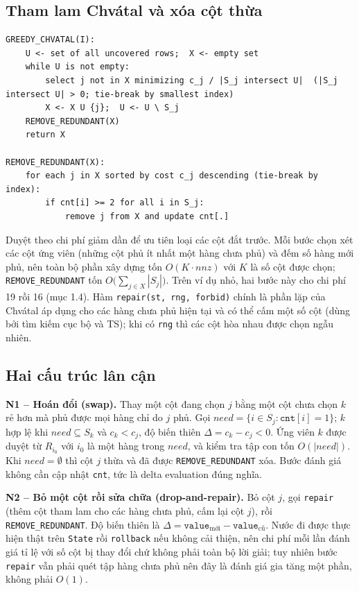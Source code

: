 \documentclass[a4paper,12pt]{article}
\begin{document}
\subsection{Tham lam Chvátal và xóa cột thừa}
\begin{Verbatim}
GREEDY_CHVATAL(I):
    U <- set of all uncovered rows;  X <- empty set
    while U is not empty:
        select j not in X minimizing c_j / |S_j intersect U|  (|S_j intersect U| > 0; tie-break by smallest index)
        X <- X U {j};  U <- U \ S_j
    REMOVE_REDUNDANT(X)
    return X

REMOVE_REDUNDANT(X):
    for each j in X sorted by cost c_j descending (tie-break by index):
        if cnt[i] >= 2 for all i in S_j:
            remove j from X and update cnt[.]
\end{Verbatim}
Duyệt theo chi phí giảm dần để ưu tiên loại các cột đắt trước. Mỗi bước chọn xét các cột ứng viên (những cột phủ ít nhất một hàng chưa phủ) và đếm số hàng mới phủ, nên toàn bộ phần xây dựng tốn $O(K\cdot nnz)$ với $K$ là số cột được chọn; \texttt{REMOVE\_REDUNDANT} tốn $O\bigl(\sum_{j\in X}|S_j|\bigr)$. Trên ví dụ nhỏ, hai bước này cho chi phí 19 rồi 16 (mục 1.4). Hàm \texttt{repair(st, rng, forbid)} chính là phần lặp của Chvátal áp dụng cho các hàng chưa phủ hiện tại và có thể cấm một số cột (dùng bởi tìm kiếm cục bộ và TS); khi có \texttt{rng} thì các cột hòa nhau được chọn ngẫu nhiên.

\subsection{Hai cấu trúc lân cận}
\textbf{N1 -- Hoán đổi (swap).} Thay một cột đang chọn $j$ bằng một cột chưa chọn $k$ rẻ hơn mà phủ được mọi hàng chỉ do $j$ phủ. Gọi $need=\{i\in S_j:\texttt{cnt}[i]=1\}$; $k$ hợp lệ khi $need\subseteq S_k$ và $c_k<c_j$, độ biến thiên $\Delta=c_k-c_j<0$. Ứng viên $k$ được duyệt từ $R_{i_0}$ với $i_0$ là một hàng trong $need$, và kiểm tra tập con tốn $O(|need|)$. Khi $need=\emptyset$ thì cột $j$ thừa và đã được \texttt{REMOVE\_REDUNDANT} xóa. Bước đánh giá không cần cập nhật \texttt{cnt}, tức là delta evaluation đúng nghĩa.

\textbf{N2 -- Bỏ một cột rồi sửa chữa (drop-and-repair).} Bỏ cột $j$, gọi \texttt{repair} (thêm cột tham lam cho các hàng chưa phủ, cấm lại cột $j$), rồi \texttt{REMOVE\_REDUNDANT}. Độ biến thiên là $\Delta=\texttt{value}_{\text{mới}}-\texttt{value}_{\text{cũ}}$. Nước đi được thực hiện thật trên \texttt{State} rồi \texttt{rollback} nếu không cải thiện, nên chi phí mỗi lần đánh giá tỉ lệ với số cột bị thay đổi chứ không phải toàn bộ lời giải; tuy nhiên bước \texttt{repair} vẫn phải quét tập hàng chưa phủ nên đây là đánh giá gia tăng một phần, không phải $O(1)$.
\end{document}
